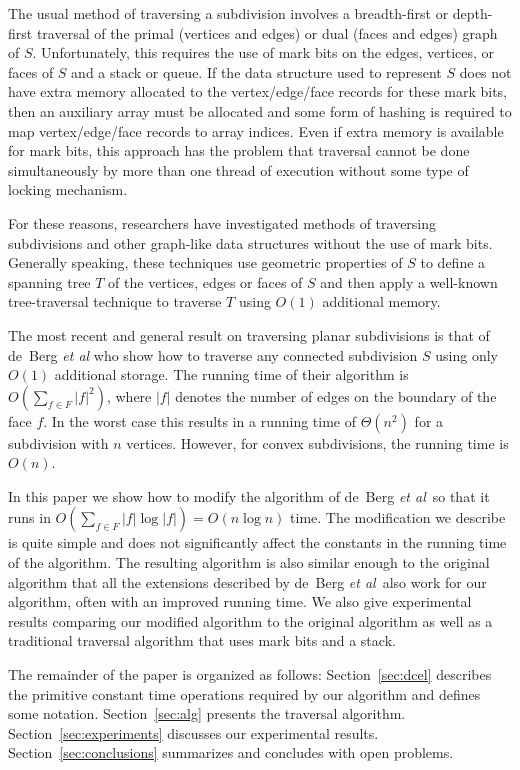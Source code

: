 \documentclass{article}
\newcommand{\secref}[1]{\mbox{Section~\ref{sec:#1}}}
\newcommand{\etal}{\emph{et al}}
\begin{document}
The usual method of traversing a subdivision involves a breadth-first
or depth-first traversal of the primal (vertices and edges) or dual
(faces and edges) graph of $S$.  Unfortunately, this requires the use
of mark bits on the edges, vertices, or faces of $S$ and a stack or
queue.  If the data structure used to represent $S$ does not have
extra memory allocated to the vertex/edge/face records for these mark
bits, then an auxiliary array must be allocated and some form of
hashing is required to map vertex/edge/face records to array indices.
Even if extra memory is available for mark bits, this approach has the
problem that traversal cannot be done simultaneously by more than one
thread of execution without some type of locking mechanism.

For these reasons, researchers have investigated methods of traversing
subdivisions and other graph-like data structures without the use of
mark bits.\cite{bkoo97,egs86,gc86,gcr77,gm78}  Generally speaking,
these techniques use geometric properties of $S$ to define a spanning
tree $T$ of the vertices, edges or faces of $S$ and then apply a
well-known tree-traversal technique to traverse $T$ using $O(1)$
additional memory.

The most recent and general result on traversing planar subdivisions
is that of \mbox{de Berg} \etal\cite{bkoo97} who show how to
traverse any connected subdivision $S$ using only $O(1)$ additional
storage.  The running time of their algorithm is $O(\sum_{f\in
F}|f|^2)$, where $|f|$ denotes the number of edges on the boundary of
the face $f$.  In the worst case this results in a running time of
$\Theta(n^2)$ for a subdivision with $n$ vertices.  However, for convex
subdivisions, the running time is $O(n)$.

In this paper we show how to modify the algorithm of \mbox{de Berg}
\etal\ so that it runs in $O(\sum_{f\in F}|f|\log|f|)= O(n\log
n)$ time.  The modification we describe is quite simple and does not
significantly affect the constants in the running time of the
algorithm.  The resulting algorithm is also similar enough to the
original algorithm that all the extensions described by \mbox{de Berg}
\etal\ also work for our algorithm, often with an improved running
time.  We also give experimental results comparing our modified
algorithm to the original algorithm as well as a traditional traversal
algorithm that uses mark bits and a stack.

The remainder of the paper is organized as follows: \secref{dcel}
describes the primitive constant time operations required by our
algorithm and defines some notation.  \secref{alg} presents the
traversal algorithm.  \secref{experiments} discusses our experimental
results.  \secref{conclusions} summarizes and concludes with open
problems.
\end{document}

